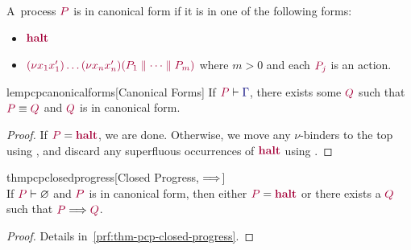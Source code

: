 \documentclass[main.tex]{subfiles}
\begin{document}
\begin{definition}
  \label{def:pcp-canonical-forms}
  A~process $\tm{P}$ is in canonical form if it is in one of the following forms:
  \begin{itemize}[noitemsep,topsep=0pt,parsep=0pt,partopsep=0pt]
  \item
    $\tm{\halt}$
  \item
    $\tm{\res{x_1}{x'_1}{\dots\res{x_n}{x'_n}{(P_1 \parallel\dots\parallel P_m)}}}$
    where $m>0$ and each $\tm{P_j}$ is an action.
  \end{itemize}
\end{definition}

\begin{restatablelemma}{lempcpcanonicalforms}[Canonical Forms]
  \label{lem:pcp-canonical-forms}
  If $\seq{P}{\ty{\Gamma}}$, there exists some $\tm{Q}$ such that $\tm{P}\equiv\tm{Q}$ and $\tm{Q}$ is in canonical form.
\end{restatablelemma}
\begin{proof}
  If $\tm{P}=\tm{\halt}$, we are done. Otherwise, we move any $\nu$-binders to the top using , and discard any superfluous occurrences of $\tm{\halt}$ using .
\end{proof}

\begin{restatabletheorem}{thmpcpclosedprogress}[Closed Progress, $\Longrightarrow$]
  \label{thm:pcp-closed-progress}
  \hfill\\%
  If $\seq{P}{\emptyenv}$ and $\tm{P}$ is in canonical form, then either $\tm{P}=\tm{\halt}$ or there exists a $\tm{Q}$ such that $\tm{P}\red\tm{Q}$.
\end{restatabletheorem}
\begin{proof}
  Details in~\cref{prf:thm-pcp-closed-progress}.
\end{proof}
\end{document}
